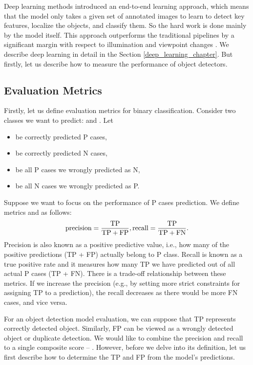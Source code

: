 Deep learning methods introduced an end-to-end learning approach, which means
that the model only takes a given set of annotated images to learn to detect key
features, localize the objects, and classify them. So the hard work is done
mainly by the model itself. This approach outperforms the traditional pipelines
by a significant margin with respect to illumination and viewpoint changes
\cite{outperforming}. We describe deep learning in detail in the Section
\ref{deep_learning_chapter}. But firstly, let us describe how to measure the
performance of object detectors.

\subsection{Evaluation Metrics}
Firstly, let us define evaluation metrics for binary classification. Consider
two classes we want to predict:  and . Let
\begin{itemize}
    \item {} be correctly predicted P cases,
    \item {} be correctly predicted N cases,
    \item {} be all P cases we wrongly predicted as N,
    \item {} be all N cases we wrongly predicted as P.
\end{itemize}
Suppose we want to focus on the performance of P cases prediction. We define
metrics  and  as follows:
$$
    \text{precision} = \frac{\text{TP}}{\text{TP} + \text{FP}}, \\
    \text{recall} = \frac{\text{TP}}{\text{TP} + \text{FN}}.
$$
Precision is also known as a positive predictive value, i.e., how many of the
positive predictions (TP + FP) actually belong to P class. Recall is known as a
true positive rate and it measures how many TP we have predicted out of all
actual P cases (TP + FN). There is a trade-off relationship between these
metrics. If we increase the precision (e.g., by setting more strict constraints
for assigning TP to a prediction), the recall decreases as there would be more
FN cases, and vice versa.

For an object detection model evaluation, we can suppose that TP represents
correctly detected object. Similarly, FP can be viewed as a wrongly detected
object or duplicate detection. We would like to combine the precision and recall
to a single composite score -- . However,
before we delve into its definition, let us first describe how to determine the
TP and FP from the model's predictions.

